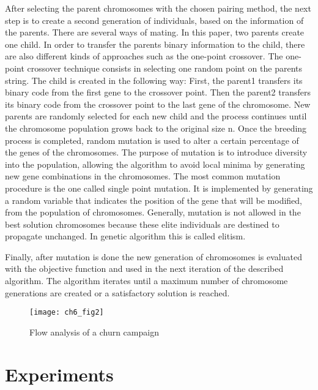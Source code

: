 After selecting the parent chromosomes with the chosen pairing method, the next step is to create a 
second generation of individuals, based on the information of the parents. There are several ways of 
mating. In this paper, two parents create one child. 
In order to transfer the parents binary information to the child, there are also different kinds 
of approaches such as the one-point crossover. The one-point crossover technique consists in 
selecting one random point on the parents string. The child is created in the following way: First, 
the parent1 transfers its binary code from the first gene to the crossover point. Then the parent2 
transfers its binary code from the crossover point to the last gene of the chromosome. New parents 
are randomly selected for each new child and the process continues until the chromosome population 
grows back to the original size n. 
Once the breeding process is completed, random mutation is used to alter a certain percentage of the 
genes of the chromosomes. The purpose of mutation is to introduce diversity into the population, 
allowing the algorithm to avoid local minima by generating new gene combinations in the chromosomes. 
The most common mutation procedure is the one called single point mutation. It is implemented by 
generating a random variable that indicates the position of the gene that will be modified, from the 
population of chromosomes. Generally, mutation is not allowed in the best solution chromosomes 
because these elite individuals are destined to propagate unchanged. In genetic algorithm this 
is called elitism.

Finally, after mutation is done the new generation of chromosomes is evaluated with the objective 
function and used in the next iteration of the described algorithm.
The algorithm iterates until a maximum number of chromosome generations are created or a 
satisfactory solution is reached.

	\begin{figure}[t]
	  \centering
    \texttt{[image: ch6\_fig2]}  
	  \caption{Flow analysis of a churn campaign \citep{Haupt2004}}
	  \label{fig:ch6:2}
	\end{figure}

\section{Experiments}